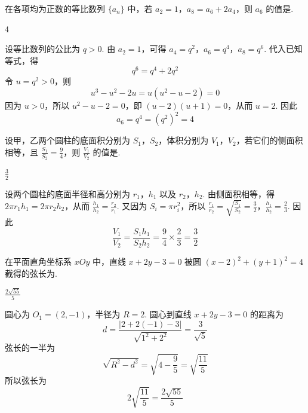 \begin{problem}
在各项均为正数的等比数列 \(\{a_{n}\}\) 中，若 \(a_{2} = 1\)，\(a_{8} = a_{6} + 2a_{4}\)，则 \(a_{6}\) 的值是\fillinblank{}.
\end{problem}

\begin{answer}
4
\end{answer}

\begin{solution}
设等比数列的公比为 \(q>0\). 由 \(a_2=1\)，可得
\(a_4=q^2\)，\(a_6=q^4\)，\(a_8=q^6\).
代入已知等式，得
\[
q^6=q^4+2q^2
\]
令 \(u=q^2>0\)，则
\[
u^3-u^2-2u=u(u^2-u-2)=0
\]
因为 \(u>0\)，所以 \(u^2-u-2=0\)，即 \((u-2)(u+1)=0\)，从而 \(u=2\). 因此
\[
a_6=q^4=(q^2)^2=4
\]
\end{solution}

\begin{problem}
设甲，乙两个圆柱的底面积分别为 \(S_{1}\)，\(S_{2}\)，体积分别为 \(V_{1}\)，\(V_{2}\)，若它们的侧面积相等，且 \(\frac{S_{1}}{S_{2}} = \frac{9}{4}\)，则 \(\frac{V_{1}}{V_{2}}\) 的值是\fillinblank{}.
\end{problem}

\begin{answer}
\(\frac{3}{2}\)
\end{answer}

\begin{solution}
设两个圆柱的底面半径和高分别为 \(r_1\)，\(h_1\) 以及 \(r_2\)，\(h_2\). 由侧面积相等，得 \(2\pi r_1h_1=2\pi r_2h_2\)，从而 \(\frac{h_1}{h_2}=\frac{r_2}{r_1}\).
又因为 \(S_i=\pi r_i^2\)，所以
\(\frac{r_1}{r_2}=\sqrt{\frac{S_1}{S_2}}=\frac32\)，\(\frac{h_1}{h_2}=\frac23\).
因此
\[
\frac{V_1}{V_2}=\frac{S_1h_1}{S_2h_2}=\frac94\times\frac23=\frac32
\]
\end{solution}

\begin{problem}
在平面直角坐标系 \(xOy\) 中，直线 \(x + 2y - 3 = 0\) 被圆 \((x - 2)^2 + (y + 1)^2 = 4\) 截得的弦长为\fillinblank{}.
\end{problem}

\begin{answer}
\(\frac{2\sqrt{55}}{5}\)
\end{answer}

\begin{solution}
圆心为 \(O_1=(2,-1)\)，半径为 \(R=2\). 圆心到直线 \(x+2y-3=0\) 的距离为
\[
d=\frac{|2+2(-1)-3|}{\sqrt{1^2+2^2}}=\frac3{\sqrt5}
\]
弦长的一半为
\[
\sqrt{R^2-d^2}=\sqrt{4-\frac95}=\sqrt{\frac{11}{5}}
\]
所以弦长为
\[
2\sqrt{\frac{11}{5}}=\frac{2\sqrt{55}}5
\]
\end{solution}

